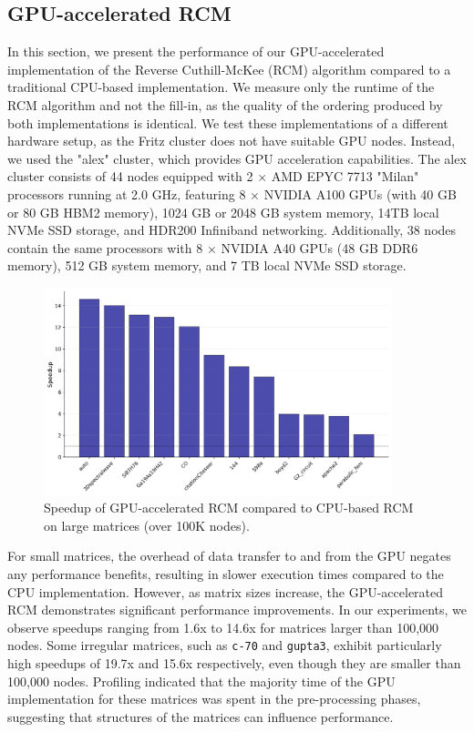 \FloatBarrier

\subsection{GPU-accelerated RCM}

In this section, we present the performance of our GPU-accelerated implementation of the Reverse Cuthill-McKee (RCM) algorithm compared to a traditional CPU-based implementation. We measure only the runtime of the RCM algorithm and not the fill-in, as the quality of the ordering produced by both implementations is identical. We test these implementations of a different hardware setup, as the Fritz cluster does not have suitable GPU nodes. Instead, we used the "alex" cluster, which provides GPU acceleration capabilities. The alex cluster consists of 44 nodes equipped with 2 × AMD EPYC 7713 "Milan" processors running at 2.0 GHz, featuring 8 × NVIDIA A100 GPUs (with 40 GB or 80 GB HBM2 memory), 1024 GB or 2048 GB system memory, 14TB local NVMe SSD storage, and HDR200 Infiniband networking. Additionally, 38 nodes contain the same processors with 8 × NVIDIA A40 GPUs (48 GB DDR6 memory), 512 GB system memory, and 7 TB local NVMe SSD storage.


\begin{figure}[H]
   \centering
   \includegraphics[width=0.9\textwidth]{fig/res/gpu_rcm_speedups_clean.png}
   \caption{Speedup of GPU-accelerated RCM compared to CPU-based RCM on large matrices (over 100K nodes).}
   \label{fig:gpu-rcm-speedups}
\end{figure}

For small matrices, the overhead of data transfer to and from the GPU negates any performance benefits, resulting in slower execution times compared to the CPU implementation. However, as matrix sizes increase, the GPU-accelerated RCM demonstrates significant performance improvements. In our experiments, we observe speedups ranging from 1.6x to 14.6x for matrices larger than 100,000 nodes. Some irregular matrices, such as \texttt{c-70} and \texttt{gupta3}, exhibit particularly high speedups of 19.7x and 15.6x respectively, even though they are smaller than 100,000 nodes. Profiling indicated that the majority time of the GPU implementation for these matrices was spent in the pre-processing phases, suggesting that structures of the matrices can influence performance.

